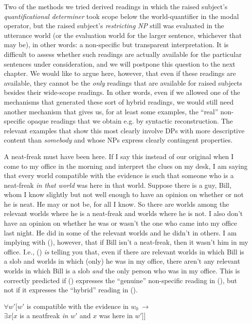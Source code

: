 Two of the methods we tried derived readings in which the raised subject's
\emph{quantificational determiner} took scope below the world-quantifier in the
modal operator, but the raised subject's \emph{restricting NP} still was
evaluated in the utterance world (or the evaluation world for the larger
sentence, whichever that may be), in other words: a non-specific but transparent
interpretation. It is difficult to assess whether such readings are actually
available for the particular sentences under consideration, and we will postpone
this question to the next chapter. We would like to argue here, however, that
even if these readings are available, they cannot be the \emph{only} readings
that are available for raised subjects besides their wide-scope readings. In
other words, even if we allowed one of the mechanisms that generated these sort
of hybrid readings, we would still need another mechanism that gives us, for at
least some examples, the ``real'' non-specific opaque readings that we obtain
e.g. by syntactic reconstruction. The relevant examples that show this most
clearly involve DPs with more descriptive content than \emph{somebody} and whose
NPs express clearly contingent properties.

\ex A neat-freak must have been here. \xe
%
If I say this instead of our original  when I come to my office in
the morning and interpret the clues on my desk, I am saying that every world
compatible with the evidence is such that someone who is a neat-freak \emph{in
  that world} was here in that world. Suppose there is a guy, Bill, whom I know
slightly but not well enough to have an opinion on whether or not he is neat. He
may or not be, for all I know. So there are worlds among the relevant worlds
where he is a neat-freak and worlds where he is not. I also don't have an
opinion on whether he was or wasn't the one who came into my office last night.
He did in some of the relevant worlds and he didn't in others. I am implying
with (\lastx), however, that if Bill isn't a neat-freak, then it wasn't him in
my office. I.e., (\lastx) \emph{is} telling you that, even if there are relevant
worlds in which Bill is a slob and worlds in which (only)
he was in my office, there aren't any relevant worlds in which Bill is a slob
\emph{and} the only person who was in my office. This is correctly predicted if
(\lastx) expresses the ``genuine'' non-specific reading in (\nextx), but not if
it expresses the ``hybrid'' reading in (\anextx).

\ex $\forall w'[w'$ is compatible with the evidence in $w_{0}\ \rightarrow$ \\
\hfill$\exists x[x$ is a neatfreak \emph{in $w'$} and $x$ was here in
$w'$]] \xe

